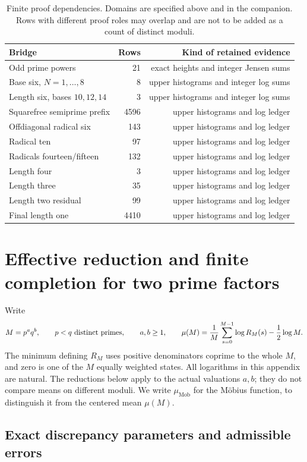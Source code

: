 \documentclass[11pt]{article}
\theoremstyle{definition}\newtheorem{definition}[theorem]{Definition}
\theoremstyle{remark}\newtheorem{remark}[theorem]{Remark}
\begin{document}
\begin{table}[ht]
\centering
\begin{tabular}{lrr}\toprule
Bridge & Rows & Kind of retained evidence\\\midrule
Odd prime powers &21&exact heights and integer Jensen sums\\
Base six, \(N=1,\ldots,8\)&8&upper histograms and integer log sums\\
Length six, bases \(10,12,14\)&3&upper histograms and integer log sums\\
Squarefree semiprime prefix&4596&upper histograms and log ledger\\
Offdiagonal radical six&143&upper histograms and log ledger\\
Radical ten&97&upper histograms and log ledger\\
Radicals fourteen/fifteen&132&upper histograms and log ledger\\
Length four&3&upper histograms and log ledger\\
Length three&35&upper histograms and log ledger\\
Length two residual&99&upper histograms and log ledger\\
Final length one&4410&upper histograms and log ledger\\\bottomrule
\end{tabular}
\caption{Finite proof dependencies. Domains are specified above and in the
companion. Rows with different proof roles may overlap and are not to be
added as a count of distinct moduli.}\label{tab:dependencies}
\end{table}


\section{Effective reduction and finite completion for two prime factors}
\label{ap:finite-two-prime}

Write
\[
 M=p^a q^b,\qquad p<q\ \hbox{distinct primes},\qquad a,b\ge1,
 \qquad
 \mu(M)=\frac1M\sum_{s=0}^{M-1}\log R_M(s)-\frac12\log M .
\]
The minimum defining \(R_M\) uses positive denominators coprime to the
whole \(M\), and zero is one of the \(M\) equally weighted states.
All logarithms in this appendix are natural.
The reductions below apply to the actual valuations \(a,b\); they do not
compare means on different moduli.
We write \(\mu_{\mathrm{Mob}}\) for the M\"obius function, to distinguish
it from the centered mean \(\mu(M)\).

\subsection{Exact discrepancy parameters and admissible errors}
\label{ap:finite:parameters}
\end{document}
